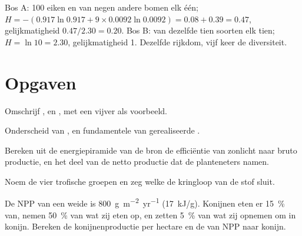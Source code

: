 \begin{example}\label{ex:b1:ecosystem-organization:twowoods}
Bos A: 100 eiken en van negen andere bomen elk één; $H = -(0.917\ln
0.917 + 9\times 0.0092\ln 0.0092) = 0.08 + 0.39 = 0.47$, gelijkmatigheid
$0.47/2.30 = 0.20$. Bos B: van dezelfde tien soorten elk tien; $H =
\ln 10 = 2.30$, gelijkmatigheid 1. Dezelfde rijkdom, vijf keer de
diversiteit.
\end{example}

\section{Opgaven}

\begin{exercise}[$\star$]\label{exo:b1:ecosystem-organization:1}
Omschrijf ,  en , met een vijver als voorbeeld.
\end{exercise}

\begin{exercise}[$\star$]\label{exo:b1:ecosystem-organization:2}
Onderscheid  van , en fundamentele van gerealiseerde .
\end{exercise}

\begin{exercise}[$\star$]\label{exo:b1:ecosystem-organization:3}
Bereken uit de energiepiramide van de bron de efficiëntie van zonlicht naar
bruto productie, en het deel van de netto productie dat de planteneters
namen.
\end{exercise}

\begin{exercise}[$\star$]\label{exo:b1:ecosystem-organization:4}
Noem de vier trofische groepen en zeg welke de kringloop van de stof sluit.
\end{exercise}

\begin{exercise}[$\star\star$]\label{exo:b1:ecosystem-organization:5}
De NPP van een weide is \qty{800}{g.m^{-2}.yr^{-1}} (\qty{17}{kJ/g}).
Konijnen eten er \qty{15}{\%} van, nemen \qty{50}{\%} van wat zij eten op,
en zetten \qty{5}{\%} van wat zij opnemen om in konijn. Bereken de
konijnenproductie per hectare en de  van NPP naar
konijn.
\end{exercise}

